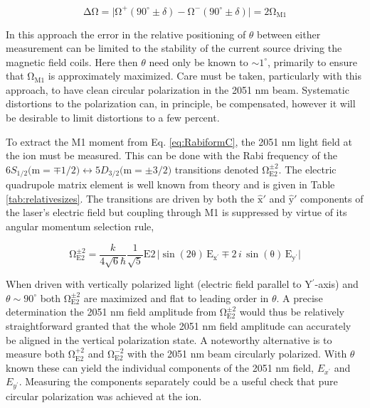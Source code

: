 \documentclass[%
 reprint,
 amsmath,amssymb,
 aps,
]{revtex4-1}
\begin{document}
\begin{equation}\label{eq:M1pol}
\mathrm{\Delta \Omega} = \big| \mathrm{\Omega^{+}}(90^{\circ}\pm\delta) - \mathrm{\Omega^{-}}(90^{\circ}\pm\delta)\big| = 2\mathrm{\Omega_{M1}}
\end{equation}	

\noindent In this approach the error in the relative positioning of $\theta$ between either measurement can be limited to the stability of the current source driving the magnetic field coils.  Here then $\theta$ need only be known to $\mathrm{\sim 1^{\circ}}$, primarily to ensure that $\mathrm{\Omega_{M1}}$ is approximately maximized.  Care must be taken, particularly with this approach, to have clean circular polarization in the 2051 nm beam.  Systematic distortions to the polarization can, in principle, be compensated, however it will be desirable to limit distortions to a few percent.

\indent  To extract the M1 moment from Eq. \ref{eq:RabiformC}, the 2051 nm light field at the ion must be measured.  This can be done with the Rabi frequency of the $6S_{1/2}\big( \mathrm{m}=\mp 1/2\big)\leftrightarrow 5D_{3/2}\big( \mathrm{m}=\pm3/2\big)$ transitions denoted $\mathrm{\Omega^{\pm 2}_{E2}}$.  The electric quadrupole matrix element is well known from theory and is given in Table \ref{tab:relativesizes}.  The transitions are driven by both the $\mathrm{\hat{x}'}$ and $\mathrm{\hat{y}'}$ components of the laser's electric field but coupling through M1 is suppressed by virtue of its angular momentum selection rule,
 
\begin{equation}
\mathrm{\Omega^{\pm 2}_{E2} = }\frac{k}{4\sqrt{6}\hbar }\frac{1}{\sqrt{5}}\mathrm{E2\,\big|\sin(2\theta)\,E_{x^{'}} \mp 2}\,i\,\mathrm{\sin(\theta)\,E_{y^{'}}\big|  }
\end{equation}

\noindent When driven with vertically polarized light (electric field parallel to Y$^{'}$-axis) and $\theta \sim 90^{\circ}$ both $\mathrm{\Omega^{\pm 2}_{E2}}$ are maximized and flat to leading order in $\theta$.  A precise determination the 2051 nm field amplitude from $\mathrm{\Omega^{\pm 2}_{E2}}$ would thus be relatively straightforward granted that the whole 2051 nm field amplitude can accurately be aligned in the vertical polarization state.  A noteworthy alternative is to measure both $\mathrm{\Omega^{+ 2}_{E2}}$ and $\mathrm{\Omega^{- 2}_{E2}}$ with the 2051 nm beam circularly polarized.  With $\theta$ known these can yield the individual components of the 2051 nm field, $E_{x^{'}}$ and $E_{y^{'}}$.  Measuring the components separately could be a useful check that pure circular polarization was achieved at the ion. 
\end{document}
